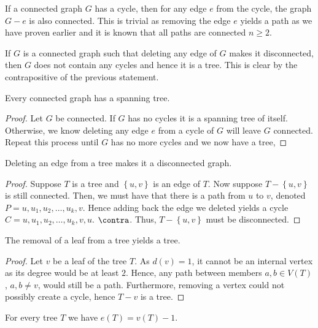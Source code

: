 \begin{proposition}
	If a connected graph $G$ has a cycle, then for any edge $e$ from the cycle, the graph $G - e$ is also connected. This is trivial as removing the edge $e$ yields a path as we have proven earlier and it is known that all paths are connected $n\ge 2$.
\end{proposition}
\begin{corollary}
	If $G$ is a connected graph such that deleting any edge of $G$ makes it disconnected, then $G$ does not contain any cycles and hence it is a tree. This is clear by the contrapositive of the previous statement.
\end{corollary}
\begin{proposition}
	Every connected graph has a spanning tree.
\end{proposition}
\begin{proof}
	Let $G$ be connected. If $G$ has no cycles it is a spanning tree of itself. Otherwise, we know deleting any edge $e$ from a cycle of $G$ will leave $G$ connected. Repeat this process until $G$ has no more cycles and we now have a tree,
\end{proof}
\begin{proposition}
	Deleting an edge from a tree makes it a disconnected graph.
\end{proposition}
\begin{proof}
	Suppose $T$ is a tree and $\left\{ u, v \right\} $ is an edge of $T$. Now suppose $T - \left\{ u, v \right\} $ is still connected. Then, we must have that there is a path from $u$ to $v$, denoted $P = u, u_1, u_2, \ldots, u_{k}, v$. Hence adding back the edge we deleted yields a cycle $C = u, u_1, u_2, \ldots, u_{k}, v, u$. $\contra$. Thus,  $T - \left\{ u, v \right\} $ must be disconnected.
\end{proof}
\begin{proposition}
	The removal of a leaf from a tree yields a tree.
\end{proposition}
\begin{proof}
	Let $v$ be a leaf of the tree $T$. As $d\left( v \right) = 1$, it cannot be an internal vertex as its degree would be at least $2$. Hence, any path between members $a, b \in V\left( T \right) $ , $a, b \neq v$, would still be a path. Furthermore, removing a vertex could not possibly create a cycle, hence $T - v$ is a tree.
\end{proof}
\begin{proposition}
	For every tree $T$ we have $e\left( T \right)  = v\left( T \right) - 1$.
\end{proposition}
